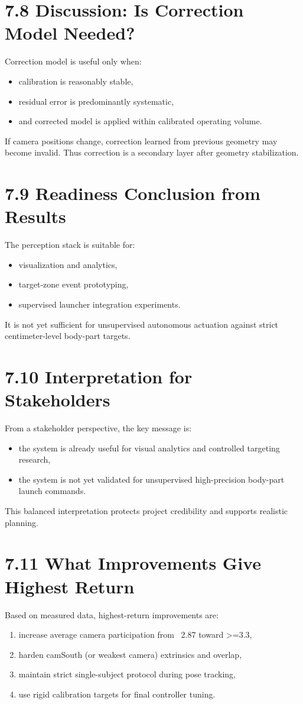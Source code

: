 \section{7.8 Discussion: Is Correction Model Needed?}
Correction model is useful only when:
\begin{itemize}
  \item calibration is reasonably stable,
  \item residual error is predominantly systematic,
  \item and corrected model is applied within calibrated operating volume.
\end{itemize}

If camera positions change, correction learned from previous geometry may become invalid. Thus correction is a secondary layer after geometry stabilization.

\section{7.9 Readiness Conclusion from Results}
The perception stack is suitable for:
\begin{itemize}
  \item visualization and analytics,
  \item target-zone event prototyping,
  \item supervised launcher integration experiments.
\end{itemize}

It is not yet sufficient for unsupervised autonomous actuation against strict centimeter-level body-part targets.


\section{7.10 Interpretation for Stakeholders}
From a stakeholder perspective, the key message is:
\begin{itemize}
  \item the system is already useful for visual analytics and controlled targeting research,
  \item the system is not yet validated for unsupervised high-precision body-part launch commands.
\end{itemize}

This balanced interpretation protects project credibility and supports realistic planning.

\section{7.11 What Improvements Give Highest Return}
Based on measured data, highest-return improvements are:
\begin{enumerate}
  \item increase average camera participation from ~2.87 toward >=3.3,
  \item harden camSouth (or weakest camera) extrinsics and overlap,
  \item maintain strict single-subject protocol during pose tracking,
  \item use rigid calibration targets for final controller tuning.
\end{enumerate}

